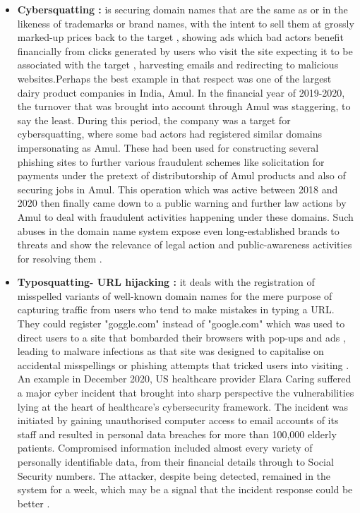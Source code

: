 \begin{itemize}
    \item \textbf{Cybersquatting :} is securing domain names that are the same as or in the likeness of trademarks or brand names, with the intent to sell them at grossly marked-up prices back to the target , showing ads which bad actors benefit financially from clicks generated by users who visit the site expecting it to be associated with the target , harvesting emails and redirecting to malicious websites.Perhaps the best example in that respect was one of the largest dairy product companies in India, Amul. In the financial year of 2019-2020, the turnover that was brought into account through Amul was staggering, to say the least. During this period, the company was a target for cybersquatting, where some bad actors had registered similar domains impersonating as Amul. These had been used for constructing several phishing sites to further various fraudulent schemes like solicitation for payments under the pretext of distributorship of Amul products and also of securing jobs in Amul. This operation which was active between 2018 and 2020 then finally came down to a public warning and further law actions by Amul to deal with fraudulent activities happening under these domains. Such abuses in the domain name system expose even long-established brands to threats and show the relevance of legal action and public-awareness activities for resolving them \cite{MehtaCybersquatting}.
    
    \item \textbf{Typosquatting- URL hijacking :} it deals with the registration of misspelled variants of well-known domain names for the mere purpose of capturing traffic from users who tend to make mistakes in typing a URL. They could register "goggle.com" instead of "google.com" which was used to direct users to a site that bombarded their browsers with pop-ups and ads , leading to malware infections as that site was designed to capitalise on accidental misspellings or phishing  attempts that tricked users into visiting \cite{SplunkTyposquatting}. An example in December 2020, US healthcare provider Elara Caring suffered a major cyber incident that brought into sharp perspective the vulnerabilities lying at the heart of healthcare's cybersecurity framework. The incident was initiated by gaining unauthorised computer access to email accounts of its staff and resulted in personal data breaches for more than 100,000 elderly patients. Compromised information included almost every variety of personally identifiable data, from their financial details through to Social Security numbers. The attacker, despite being detected, remained in the system for a week, which may be a signal that the incident response could be better \cite{PandaSecurityPhishing}.
    

\end{itemize}
